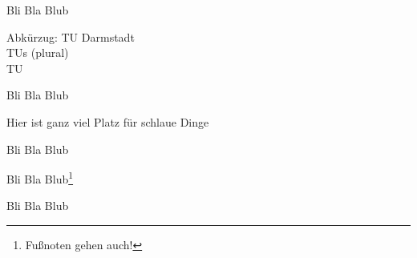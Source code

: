 

Bli Bla Blub

Abkürzug: \ac{TU} Darmstadt \\ \acp{TU} (plural) \\ \ac{TU}




Bli Bla Blub




Hier ist ganz viel Platz für schlaue Dinge \citep{murphyGlobalGovernancePoorly2000}



Bli Bla Blub \citep{jorkeGrosseDemokratieUber2019} 


Bli Bla Blub\footnote{Fußnoten gehen auch!}



Bli Bla Blub
